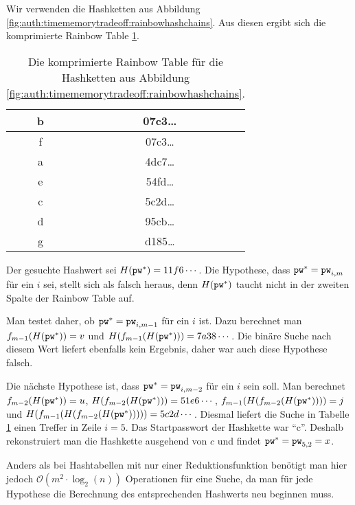 \begin{beispiel}
	Wir verwenden die Hashketten aus Abbildung \ref{fig:auth:timememorytradeoff:rainbowhashchains}. Aus diesen ergibt sich die komprimierte Rainbow Table \ref{table:auth:rainbowtable}.
	
\begin{table}[h]
	\begin{center}
		\begin{tabular}{|c|c|}
			\hline
			b & 07c3\ldots\\\hline
			f & 07c3\ldots\\\hline
			a & 4dc7\ldots\\\hline
			e & 54fd\ldots\\\hline
			c & 5c2d\ldots\\\hline
			d & 95cb\ldots\\\hline
			g & d185\ldots\\\hline
		\end{tabular}
	\end{center}
	\caption{Die komprimierte Rainbow Table für die Hashketten aus Abbildung \ref{fig:auth:timememorytradeoff:rainbowhashchains}.}
	\label{table:auth:rainbowtable}
\end{table}

	Der gesuchte Hashwert sei $H(\texttt{pw}^*) = 11f6\cdots$.
	Die Hypothese, dass $\texttt{pw}^* = \texttt{pw}_{i,m}$ für ein $i$ sei, stellt sich als falsch heraus, denn $H(\texttt{pw}^*)$ taucht nicht in der zweiten Spalte der Rainbow Table auf.
	
	Man testet daher, ob $\texttt{pw}^* = \texttt{pw}_{i,m-1}$ für ein $i$ ist. Dazu berechnet man $f_{m-1}(H(\texttt{pw}^*)) = v$ und $H(f_{m-1}(H(\texttt{pw}^*))) = 7a38\cdots$. Die binäre Suche nach diesem Wert liefert ebenfalls kein Ergebnis, daher war auch diese Hypothese falsch.
	
	Die nächste Hypothese ist, dass $\texttt{pw}^* = \texttt{pw}_{i,m-2}$ für ein $i$ sein soll.
	Man berechnet $f_{m-2}(H(\texttt{pw}^*)) = u$, $H(f_{m-2}(H(\texttt{pw}^*))) = 51e6\cdots$, $f_{m-1}(H(f_{m-2}(H(\texttt{pw}^*)))) = j$ und $H(f_{m-1}(H(f_{m-2}(H(\texttt{pw}^*))))) = 5c2d\cdots$. Diesmal liefert die Suche in Tabelle \ref{table:auth:rainbowtable} einen Treffer in Zeile $i = 5$. Das Startpasswort der Hashkette war "`c"'. Deshalb rekonstruiert man die Hashkette ausgehend von $c$ und findet $\texttt{pw}^* = \texttt{pw}_{5,2} = x$.\\
\end{beispiel}

Anders als bei Hashtabellen mit nur einer Reduktionsfunktion benötigt man hier jedoch $\mathcal{O}(m^2 \cdot \log_2(n))$ Operationen für eine Suche, da man für jede Hypothese die Berechnung des entsprechenden Hashwerts neu beginnen muss.

